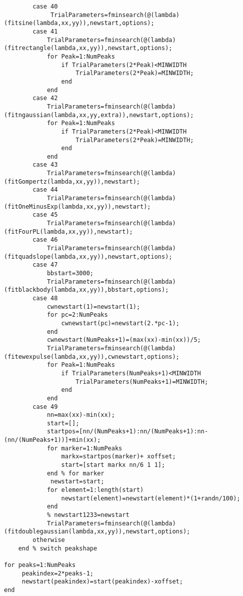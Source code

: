 \begin{lstlisting}
        case 40
             TrialParameters=fminsearch(@(lambda)(fitsine(lambda,xx,yy)),newstart,options);
        case 41
            TrialParameters=fminsearch(@(lambda)(fitrectangle(lambda,xx,yy)),newstart,options);
            for Peak=1:NumPeaks
                if TrialParameters(2*Peak)<MINWIDTH
                    TrialParameters(2*Peak)=MINWIDTH;
                end
            end
        case 42
            TrialParameters=fminsearch(@(lambda)(fitngaussian(lambda,xx,yy,extra)),newstart,options);
            for Peak=1:NumPeaks
                if TrialParameters(2*Peak)<MINWIDTH
                    TrialParameters(2*Peak)=MINWIDTH;
                end
            end
        case 43
            TrialParameters=fminsearch(@(lambda)(fitGompertz(lambda,xx,yy)),newstart);
        case 44
            TrialParameters=fminsearch(@(lambda)(fitOneMinusExp(lambda,xx,yy)),newstart);           
        case 45
            TrialParameters=fminsearch(@(lambda)(fitFourPL(lambda,xx,yy)),newstart);  
        case 46
            TrialParameters=fminsearch(@(lambda)(fitquadslope(lambda,xx,yy)),newstart,options);
        case 47
            bbstart=3000;
            TrialParameters=fminsearch(@(lambda)(fitblackbody(lambda,xx,yy)),bbstart,options);
        case 48
            cwnewstart(1)=newstart(1);
            for pc=2:NumPeaks
                cwnewstart(pc)=newstart(2.*pc-1);
            end
            cwnewstart(NumPeaks+1)=(max(xx)-min(xx))/5;
            TrialParameters=fminsearch(@(lambda)(fitewexpulse(lambda,xx,yy)),cwnewstart,options);
            for Peak=1:NumPeaks
                if TrialParameters(NumPeaks+1)<MINWIDTH
                    TrialParameters(NumPeaks+1)=MINWIDTH;
                end
            end
        case 49
            nn=max(xx)-min(xx);
            start=[];
            startpos=[nn/(NumPeaks+1):nn/(NumPeaks+1):nn-(nn/(NumPeaks+1))]+min(xx);
            for marker=1:NumPeaks
                markx=startpos(marker)+ xoffset;
                start=[start markx nn/6 1 1];
            end % for marker
             newstart=start;
            for element=1:length(start)
                newstart(element)=newstart(element)*(1+randn/100);
            end
            % newstart1233=newstart
            TrialParameters=fminsearch(@(lambda)(fitdoublegaussian(lambda,xx,yy)),newstart,options);
        otherwise
    end % switch peakshape
    
for peaks=1:NumPeaks
     peakindex=2*peaks-1;
     newstart(peakindex)=start(peakindex)-xoffset;
end


\end{lstlisting}
